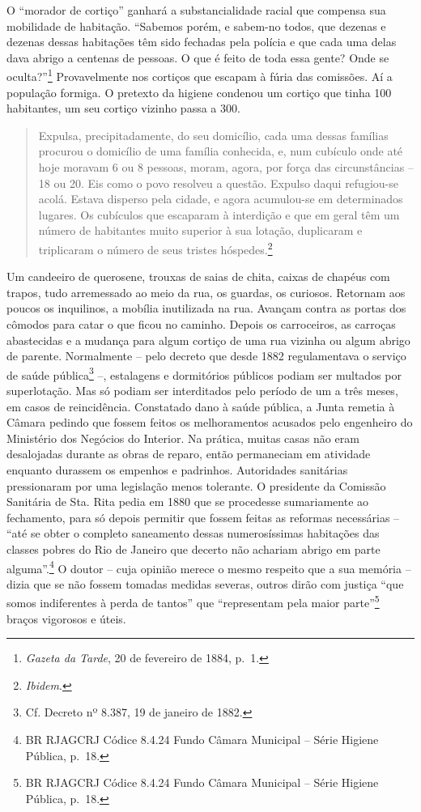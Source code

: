 O ``morador de cortiço'' ganhará a substancialidade racial que compensa
sua mobilidade de habitação. ``Sabemos porém, e sabem-no todos, que
dezenas e dezenas dessas habitações têm sido fechadas pela polícia e que
cada uma delas dava abrigo a centenas de pessoas. O que é feito de toda
essa gente? Onde se oculta?''\footnote{\emph{Gazeta da Tarde}, 20 de
  fevereiro de 1884, p.~1.} Provavelmente nos cortiços que escapam à
fúria das comissões. Aí a população formiga. O pretexto da higiene
condenou um cortiço que tinha 100 habitantes, um seu cortiço vizinho
passa a 300.

\begin{quote}
Expulsa, precipitadamente, do seu domicílio, cada uma dessas famílias
procurou o domicílio de uma família conhecida, e, num cubículo onde até
hoje moravam 6 ou 8 pessoas, moram, agora, por força das circunstâncias
-- 18 ou 20. Eis como o povo resolveu a questão. Expulso daqui
refugiou-se acolá. Estava disperso pela cidade, e agora acumulou-se em
determinados lugares. Os cubículos que escaparam à interdição e que em
geral têm um número de habitantes muito superior à sua lotação,
duplicaram e triplicaram o número de seus tristes hóspedes.\footnote{\emph{Ibidem}.}
\end{quote}

Um candeeiro de querosene, trouxas de saias de chita, caixas de chapéus
com trapos, tudo arremessado ao meio da rua, os guardas, os curiosos.
Retornam aos poucos os inquilinos, a mobília inutilizada na rua. Avançam
contra as portas dos cômodos para catar o que ficou no caminho. Depois
os carroceiros, as carroças abastecidas e a mudança para algum cortiço
de uma rua vizinha ou algum abrigo de parente. Normalmente -- pelo
decreto que desde 1882 regulamentava o serviço de saúde
pública\footnote{Cf. Decreto nº 8.387, 19 de janeiro de 1882.} --,
estalagens e dormitórios públicos podiam ser multados por superlotação.
Mas só podiam ser interditados pelo período de um a três meses, em casos
de reincidência. Constatado dano à saúde pública, a Junta remetia à
Câmara pedindo que fossem feitos os melhoramentos acusados pelo
engenheiro do Ministério dos Negócios do Interior. Na prática, muitas
casas não eram desalojadas durante as obras de reparo, então permaneciam
em atividade enquanto durassem os empenhos e padrinhos. Autoridades
sanitárias pressionaram por uma legislação menos tolerante. O presidente
da Comissão Sanitária de Sta. Rita pedia em 1880 que se procedesse
sumariamente ao fechamento, para só depois permitir que fossem feitas as
reformas necessárias -- ``até se obter o completo saneamento dessas
numerosíssimas habitações das classes pobres do Rio de Janeiro que
decerto não achariam abrigo em parte alguma''.\footnote{BR RJAGCRJ
  Códice 8.4.24 Fundo Câmara Municipal -- Série Higiene Pública, p.~18.}
O doutor -- cuja opinião merece o mesmo respeito que a sua memória --
dizia que se não fossem tomadas medidas severas, outros dirão com
justiça ``que somos indiferentes à perda de tantos'' que ``representam
pela maior parte''\footnote{BR RJAGCRJ Códice 8.4.24 Fundo Câmara
  Municipal -- Série Higiene Pública, p.~18.} braços vigorosos e úteis.

